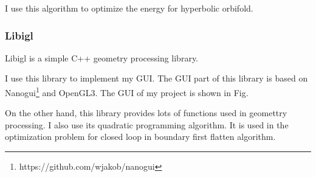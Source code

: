 I use this algorithm to optimize the energy for hyperbolic orbifold.

\subsubsection{Libigl} 
Libigl \cite{libigl} is a simple C++ geometry processing library. 

I use this library to implement my GUI. The GUI part of this library is based on Nanogui\footnote{https://github.com/wjakob/nanogui} and OpenGL3. The GUI of my project is shown in Fig.



On the other hand, this library provides lots of functions used in geomettry processing. I also use its quadratic programming algorithm. It is used in the optimization problem for closed loop in boundary first flatten algorithm.

